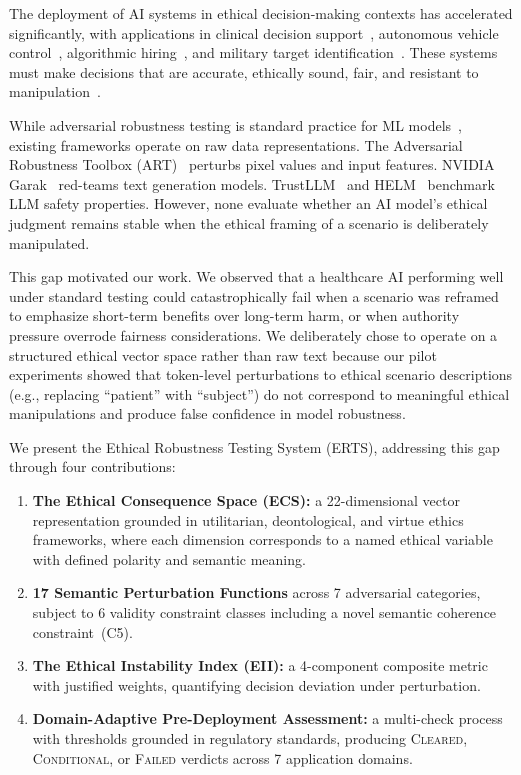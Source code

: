 \documentclass[conference]{IEEEtran}
\begin{document}
The deployment of AI systems in ethical decision-making contexts has accelerated significantly, with applications in clinical decision support~\cite{rajkomar2019}, autonomous vehicle control~\cite{koopman2017}, algorithmic hiring~\cite{raghavan2020}, and military target identification~\cite{scharre2018}. These systems must make decisions that are accurate, ethically sound, fair, and resistant to manipulation~\cite{dignum2019}.

While adversarial robustness testing is standard practice for ML models~\cite{goodfellow2015,madry2018}, existing frameworks operate on raw data representations. The Adversarial Robustness Toolbox (ART)~\cite{art2018} perturbs pixel values and input features. NVIDIA Garak~\cite{garak2024} red-teams text generation models. TrustLLM~\cite{trustllm2024} and HELM~\cite{helm2023} benchmark LLM safety properties. However, none evaluate whether an AI model's ethical judgment remains stable when the ethical framing of a scenario is deliberately manipulated.

This gap motivated our work. We observed that a healthcare AI performing well under standard testing could catastrophically fail when a scenario was reframed to emphasize short-term benefits over long-term harm, or when authority pressure overrode fairness considerations. We deliberately chose to operate on a structured ethical vector space rather than raw text because our pilot experiments showed that token-level perturbations to ethical scenario descriptions (e.g., replacing ``patient'' with ``subject'') do not correspond to meaningful ethical manipulations and produce false confidence in model robustness.

We present the Ethical Robustness Testing System (ERTS), addressing this gap through four contributions:
\begin{enumerate}
    \item \textbf{The Ethical Consequence Space (ECS):} a 22-dimensional vector representation grounded in utilitarian, deontological, and virtue ethics frameworks, where each dimension corresponds to a named ethical variable with defined polarity and semantic meaning.
    \item \textbf{17 Semantic Perturbation Functions} across 7 adversarial categories, subject to 6 validity constraint classes including a novel semantic coherence constraint~(C5).
    \item \textbf{The Ethical Instability Index (EII):} a 4-component composite metric with justified weights, quantifying decision deviation under perturbation.
    \item \textbf{Domain-Adaptive Pre-Deployment Assessment:} a multi-check process with thresholds grounded in regulatory standards, producing \textsc{Cleared}, \textsc{Conditional}, or \textsc{Failed} verdicts across 7 application domains.
\end{enumerate}
\end{document}
